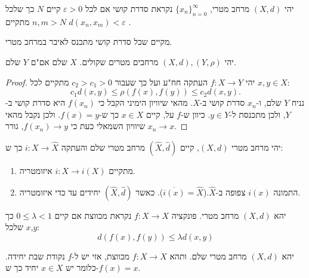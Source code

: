 \documentclass{tstextbook}
\begin{document}
\begin{definition}
יהי \((X,d)\) מרחב מטרי, \(\{ x_n\}_{n=0}^{\infty}\)  נקראת סדרת קושי אם לכל \(\varepsilon>0\) קיים \(N\) כך שלכל \(n,m>N\) מתקיים \(d(x_{n},x_{m})<\varepsilon\) .

\end{definition}
\begin{definition}
מקיים שכל סדרת קושי מתכנס לאיבר במרחב מטרי.

\end{definition}
\begin{proposition}
יהי \((X,d), \left( Y,\rho \right)\) מרחבים מטרים שקולים. \(X\) שלם אם"ם \(Y\) שלם.

\end{proposition}
\begin{proof}
יהי \(f:X\to Y\) העתקה חח"ע ועל כך שעבור \(c_{2}>c_{1}>0\) מתקיים לכל \(x,y\in X\):
$$c_{1}d(x,y)\leq\rho(f(x),f(y))\leq c_{2}d(x,y).$$
נניח \(Y\) שלם, ו-\(x_{n}\) סדרת קושי ב-\(X\). מהאי שיוויון הימיני הקבל כי \(f(x_{n})\) היא סדרת קושי ב-\(Y\), ולכן מתכנסת ל-\(y\in Y\). כיוון ש-\(f\) על, קיים \(x \in X\) כך ש-\(f(x)=y\). ולכן נקבל מהאי שיוויון השמאלי כעת כי \(f(x_{n})\to y\), גורר \(x_{n}\to x\).

\end{proof}
\begin{theorem}
יהי מרחב מטרי \((X,d)\), קיים \((\hat{X},\hat{d})\)  מרחב מטרי שלם והעתקה \(i:X\to \hat{X}\) כך ש:

  \begin{enumerate}
    \item מתקיים \(i:X\to i(X)\) איזומטריה.  


    \item התמונה \(i(x)\) צפופה ב-\(\hat{X}\).(\(\overline{i(x)}=\hat{X}\)). 
כאשר \((\hat{X},\hat{d})\) יחידים עד כדי איזומטריה.


  \end{enumerate}
\end{theorem}
\begin{definition}
יהא \((X,d)\) מרחב מטרי. פונקציה \(f:X\to X\) נקראת מכווצת אם קיים \(0\leq \lambda<1\) כך שלכל \(x\),\(y\):
$$d(f(x),f(y))\leq \lambda d(x,y)$$

\end{definition}
\begin{theorem}
יהא \((X,d)\) מרחב מטרי שלם. ותהא \(f:X\to X\) מכווצת, אזי יש ל-\(f\) נקודת שבת יחידה. כלומר יש \(x \in X\) יחיד כך ש-\(f(x)=x\).

\end{theorem}
\end{document}
